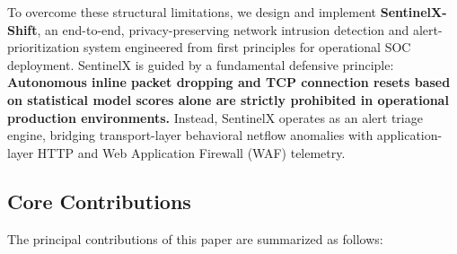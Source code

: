 \documentclass[conference]{IEEEtran}
\begin{document}
To overcome these structural limitations, we design and implement \textbf{SentinelX-Shift}, an end-to-end, privacy-preserving network intrusion detection and alert-prioritization system engineered from first principles for operational SOC deployment. SentinelX is guided by a fundamental defensive principle: \textbf{Autonomous inline packet dropping and TCP connection resets based on statistical model scores alone are strictly prohibited in operational production environments.} Instead, SentinelX operates as an alert triage engine, bridging transport-layer behavioral netflow anomalies with application-layer HTTP and Web Application Firewall (WAF) telemetry.

\subsection{Core Contributions}
The principal contributions of this paper are summarized as follows:
\end{document}
